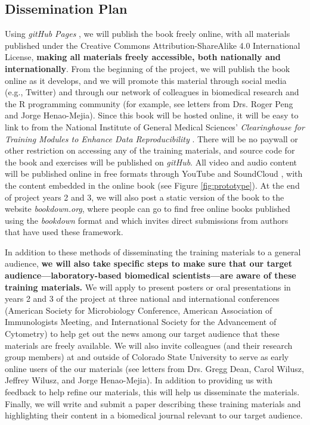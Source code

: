 \documentclass[pdftex,english,11.5pt,parskip=half]{scrartcl}
\begin{document}


\subsection{Dissemination Plan}

Using \textit{gitHub Pages} \cite{gitpages}, we will publish the book freely online, with all materials published under the Creative Commons Attribution-ShareAlike 4.0 International License, \textbf{making all materials freely accessible, both nationally and internationally}. From the beginning of the project, we will publish the book online as it develops, and we will promote this material through social media (e.g., Twitter) and through our network of colleagues in biomedical research and the R programming community (for example, see letters from Drs. Roger Peng and Jorge Henao-Mejia). Since this book will be hosted online, it will be easy to link to from the National Institute of General Medical Sciences' \textit{Clearinghouse for Training Modules to Enhance Data Reproducibility} \cite{clearinghouse}. There will be no paywall or other restriction on accessing any of the training materials, and source code for the book and exercises will be published on \textit{gitHub}. All video and audio content will be published online in free formats through YouTube \cite{youtube} and SoundCloud \cite{soundcloud}, with the content embedded in the online book (see Figure \ref*{fig:prototype}). At the end of project years 2 and 3, we will also post a static version of the book to the website \textit{bookdown.org}, where people can go to find free online books published using the \textit{bookdown} format and which invites direct submissions from authors that have used these framework. 

In addition to these methods of disseminating the training materials to a general audience, \textbf{we will also take specific steps to make sure that our target audience---laboratory-based biomedical scientists---are aware of these training materials.} We will apply to present posters or oral presentations in years 2 and 3 of the project at three national and international conferences (American Society for Microbiology Conference, American Association of Immunologists Meeting, and International Society for the Advancement of Cytometry) to help get out the news among our target audience that these materials are freely available. We will also invite colleagues (and their research group members) at and outside of Colorado State University to serve as early online users of the our materials (see letters from Drs. Gregg Dean, Carol Wilusz, Jeffrey Wilusz, and Jorge Henao-Mejia). In addition to providing us with feedback to help refine our materials, this will help us disseminate the materials. Finally, we will write and submit a paper describing these training materials and highlighting their content in a biomedical journal relevant to our target audience.
\end{document}
